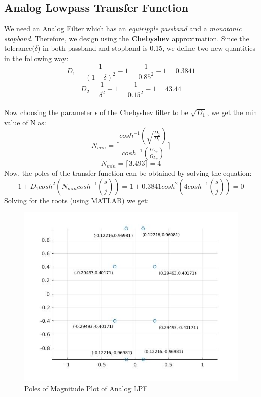 \documentclass[12pt]{article}
\newcommand\ceil[1]{\lceil#1\rceil}
\begin{document}
\subsection{Analog Lowpass Transfer Function}
We need an Analog Filter which has an \textit{equiripple passband} and a \textit{monotonic stopband}. Therefore, we design using the \textbf{Chebyshev} approximation. Since the tolerance($\delta$) in both passband and stopband is 0.15, we define two new quantities in the following way:
\begin{equation*}
D_{1} =  \frac{1}{(1-\delta)^{2}} -1 = \frac{1}{0.85^{2}} -1  = 0.3841
\end{equation*}
\begin{equation*}
D_{2} = \frac{1}{\delta ^{2}} - 1 = \frac{1}{0.15^{2}} - 1 = 43.44
\end{equation*}
\\Now choosing the parameter $\epsilon$ of the Chebyshev filter to be $\sqrt{D_{1}}$, we get the min value of N as:
\begin{equation*}
N_{min} = \ceil{\frac{cosh^{-1}(\sqrt{\frac{D_{2}}{D_{1}}})}{cosh^{-1}(\frac{\Omega _{L_{S}}}{\Omega _{L_{P}}})}}
\end{equation*}
\begin{equation*}
N_{min} = \ceil{3.493} = 4
\end{equation*}
Now, the poles of the transfer function can be obtained by solving the equation:
\begin{equation*}
1 + D_{1}cosh^{2}(N_{min}cosh^{-1}(\frac{s}{j})) = 1 + 0.3841cosh^{2}(4cosh^{-1}(\frac{s}{j})) = 0
\end{equation*}
Solving for the roots (using MATLAB) we get:
\begin{figure}[h!]
	\centering	
	\includegraphics[scale = 0.7]{RootPlot.jpg}
    \caption{Poles of Magnitude Plot of Analog LPF}
\end{figure}
\end{document}

